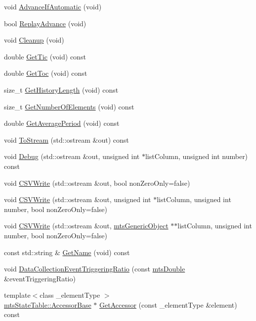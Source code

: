 \begin{DoxyCompactItemize}
\item 
void \hyperlink{classmts_state_table_a13bb09e7741f52ecd32d467288a8c76f}{Advance\-If\-Automatic} (void)
\item 
bool \hyperlink{classmts_state_table_a3f8c447425387b9d800f51faf103012e}{Replay\-Advance} (void)
\item 
void \hyperlink{classmts_state_table_a7f59a9b526992aac3cdefdf9c2fbe4e3}{Cleanup} (void)
\item 
double \hyperlink{classmts_state_table_aa695094a8af0f6d8ffd3a6e20adcd09d}{Get\-Tic} (void) const 
\item 
double \hyperlink{classmts_state_table_a7ba7a73fa7e7b491a49fcb1127102771}{Get\-Toc} (void) const 
\item 
size\-\_\-t \hyperlink{classmts_state_table_a4502a52086aca4aaf4f4853708def87e}{Get\-History\-Length} (void) const 
\item 
size\-\_\-t \hyperlink{classmts_state_table_a9194db064ae86a07d5738ca03a757188}{Get\-Number\-Of\-Elements} (void) const 
\item 
double \hyperlink{classmts_state_table_ab18e6726bb1809fb191ea23a90bf29ac}{Get\-Average\-Period} (void) const 
\item 
void \hyperlink{classmts_state_table_a8ec45edf2a475992075d8a14be86adce}{To\-Stream} (std\-::ostream \&out) const 
\item 
void \hyperlink{classmts_state_table_ac8cd65c926cd89d97da11d2907b40577}{Debug} (std\-::ostream \&out, unsigned int $\ast$list\-Column, unsigned int number) const 
\item 
void \hyperlink{classmts_state_table_a474a5b45afd3a6646f9b912e52646496}{C\-S\-V\-Write} (std\-::ostream \&out, bool non\-Zero\-Only=false)
\item 
void \hyperlink{classmts_state_table_ad143891bfb77368876892218c7539150}{C\-S\-V\-Write} (std\-::ostream \&out, unsigned int $\ast$list\-Column, unsigned int number, bool non\-Zero\-Only=false)
\item 
void \hyperlink{classmts_state_table_a4b7e287520f880473f4cd443bbbdfc85}{C\-S\-V\-Write} (std\-::ostream \&out, \hyperlink{classmts_generic_object}{mts\-Generic\-Object} $\ast$$\ast$list\-Column, unsigned int number, bool non\-Zero\-Only=false)
\item 
const std\-::string \& \hyperlink{classmts_state_table_a8222c4343bf166ea479db74f8399faa6}{Get\-Name} (void) const 
\item 
void \hyperlink{classmts_state_table_ab32cf58041bda4f7af46d57d8ba48943}{Data\-Collection\-Event\-Triggering\-Ratio} (const \hyperlink{mts_generic_object_proxy_8h_a31e76b0190a8d3f9838626cd7b47bd75}{mts\-Double} \&event\-Triggering\-Ratio)
\item 
{\footnotesize template$<$class \-\_\-element\-Type $>$ }\\\hyperlink{classmts_state_table_1_1_accessor_base}{mts\-State\-Table\-::\-Accessor\-Base} $\ast$ \hyperlink{classmts_state_table_a34156ee2a483ae1b9c7dfc52ef1a196a}{Get\-Accessor} (const \-\_\-element\-Type \&element) const 
\end{DoxyCompactItemize}
